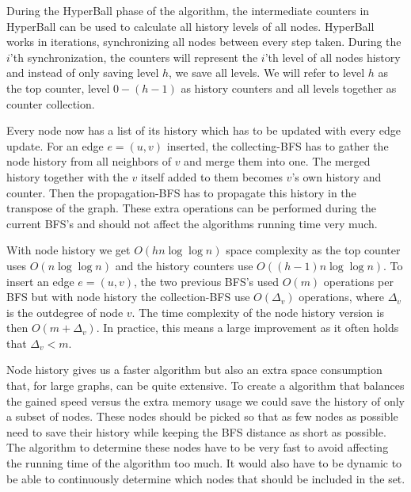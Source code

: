 During the HyperBall phase of the algorithm, the intermediate counters in HyperBall can be used to calculate all history levels of all nodes. HyperBall works in iterations, synchronizing all nodes between every step taken. During the $i$'th synchronization, the counters will represent the $i$'th level of all nodes history and instead of only saving level $h$, we save all levels. We will refer to level $h$ as the top counter, level $0 - (h-1)$ as history counters and all levels together as counter collection.  

Every node now has a list of its history which has to be updated with every edge update. For an edge $e = (u,v)$ inserted, the collecting-BFS has to gather the node history from all neighbors of $v$ and merge them into one. The merged history together with the $v$ itself added to them becomes $v$'s own history and counter. Then the propagation-BFS has to propagate this history in the transpose of the graph. These extra operations can be performed during the current BFS's and should not affect the algorithms running time very much.

With node history we get $O(hn \log \log n)$ space complexity as the top counter uses $O(n \log \log n)$ and the history counters use $O((h-1)n \log \log n)$. To insert an edge $e = (u,v)$, the two previous BFS's used $O(m)$ operations per BFS but with node history the collection-BFS use $O(\Delta_v)$ operations, where $\Delta_v$ is the outdegree of node $v$. The time complexity of the node history version is then $O(m + \Delta_v)$. In practice, this means a large improvement as it often holds that $\Delta_v < m$.

Node history gives us a faster algorithm but also an extra space consumption that, for large graphs, can be quite extensive. To create a  algorithm that balances the gained speed versus the extra memory usage we could save the history of only a subset of nodes. These nodes should be picked so that as few nodes as possible need to save their history while keeping the BFS distance as short as possible. The algorithm to determine these nodes have to be very fast to avoid affecting the running time of the algorithm too much. It would also have to be dynamic to be able to continuously determine which nodes that should be included in the set.

